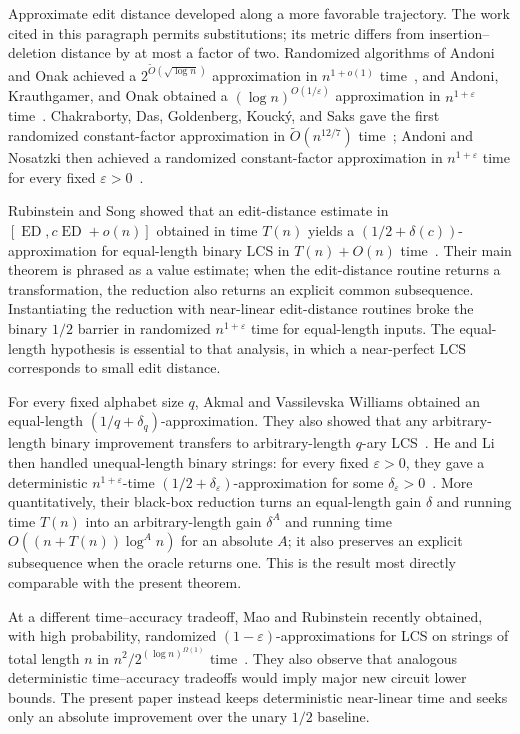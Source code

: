 \documentclass[11pt]{article}
\theoremstyle{remark}
\begin{document}
Approximate edit distance developed along a more favorable trajectory.  The
work cited in this paragraph permits substitutions; its metric differs from
insertion--deletion distance by at most a factor of two.
Randomized algorithms of Andoni and Onak achieved a
$2^{\widetilde O(\sqrt{\log n})}$ approximation in $n^{1+o(1)}$
time~\cite{AndoniOnak}, and Andoni, Krauthgamer, and Onak obtained a
$(\log n)^{O(1/\varepsilon)}$ approximation in $n^{1+\varepsilon}$
time~\cite{AndoniKrauthgamerOnak}.  Chakraborty, Das, Goldenberg, Kouck\'y,
and Saks gave the first randomized constant-factor approximation in
$\widetilde O(n^{12/7})$ time~\cite{CDGKS}; Andoni and Nosatzki then achieved
a randomized constant-factor approximation in $n^{1+\varepsilon}$ time for
every fixed $\varepsilon>0$~\cite{AndoniNosatzki}.

Rubinstein and Song showed that an edit-distance estimate in
$[\operatorname{ED},c\operatorname{ED}+o(n)]$ obtained in time $T(n)$ yields
a $(1/2+\delta(c))$-approximation for equal-length binary LCS in
$T(n)+O(n)$ time~\cite{RubinsteinSong}.  Their main theorem is phrased as a
value estimate; when the edit-distance routine returns a transformation, the
reduction also returns an explicit common subsequence.  Instantiating the
reduction with near-linear edit-distance routines broke the binary $1/2$
barrier in randomized $n^{1+\varepsilon}$ time for equal-length inputs.  The
equal-length hypothesis is essential to that analysis, in which a
near-perfect LCS corresponds to small edit distance.

For every fixed alphabet size $q$, Akmal and Vassilevska Williams obtained an
equal-length $(1/q+\delta_q)$-approximation.  They also showed that any
arbitrary-length binary improvement transfers to arbitrary-length $q$-ary
LCS~\cite{AkmalVW}.  He and Li then handled unequal-length binary
strings: for every fixed $\varepsilon>0$, they gave a deterministic
$n^{1+\varepsilon}$-time $(1/2+\delta_\varepsilon)$-approximation for some
$\delta_\varepsilon>0$~\cite{HeLi}.  More
quantitatively, their black-box reduction turns an equal-length gain $\delta$
and running time $T(n)$ into an arbitrary-length gain $\delta^A$ and running
time $O((n+T(n))\log^A n)$ for an absolute $A$; it also preserves an explicit
subsequence when the oracle returns one.  This is the result most directly
comparable with the present theorem.

At a different time--accuracy tradeoff, Mao and Rubinstein recently obtained,
with high probability, randomized $(1-\varepsilon)$-approximations for LCS on
strings of total length $n$ in
$n^2/2^{(\log n)^{\Omega(1)}}$ time~\cite{MaoRubinstein}.  They also observe
that analogous deterministic time--accuracy tradeoffs would imply major new
circuit lower bounds.  The present paper instead keeps deterministic
near-linear time and seeks only an absolute improvement over the unary $1/2$
baseline.
\end{document}
